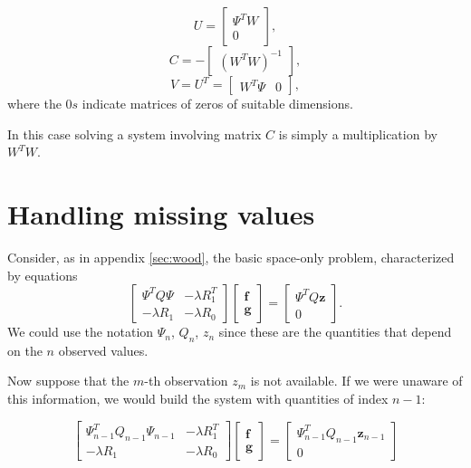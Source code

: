 \begin{equation*}
	U =
	\begin{bmatrix}
		\Psi^TW \\
		0
	\end{bmatrix}
	,
\end{equation*}
\begin{equation*}
	C = -
	\begin{bmatrix}
		\left(W^TW\right)^{-1}
	\end{bmatrix}
	,
\end{equation*}
\begin{equation*}
	V = U^T =
	\begin{bmatrix}
		W^T\Psi & 0
	\end{bmatrix}
	,
\end{equation*} where the $0s$ indicate matrices of zeros of suitable dimensions.

In this case solving a system involving matrix $C$ is simply a multiplication
by $W^T W$.

\section{Handling missing values}
\label{secNA}
Consider, as in appendix \ref{sec:wood}, the basic space-only problem,
characterized by equations
\begin{equation}
	\begin{bmatrix}
		\Psi^TQ\Psi  & -\lambda R_1^T \\
		-\lambda R_1 & -\lambda R_0
	\end{bmatrix}
	\begin{bmatrix}
		\bm{f} \\
		\bm{g}
	\end{bmatrix}
	=
	\begin{bmatrix}{\Psi}^T Q\bm{z} \\
		0
	\end{bmatrix}
	.
\end{equation}
We could use the notation $\Psi_n$, $Q_n$, $z_n$ since these are the
quantities that depend on the $n$ observed values.

Now suppose that the $m$-th observation $z_m$ is not available. If we were
unaware of this information, we would build the system with quantities of index
$n-1$:

\begin{equation}
	\label{n-1}
	\begin{bmatrix}
		\Psi_{n-1}^TQ_{n-1}\Psi_{n-1} & -\lambda R_1^T \\
		-\lambda R_1                  & -\lambda R_0
	\end{bmatrix}
	\begin{bmatrix}
		\bm{f} \\
		\bm{g}
	\end{bmatrix}
	=
	\begin{bmatrix}{\Psi}_{n-1}^T Q_{n-1}\bm{z}_{n-1} \\
		0
	\end{bmatrix}
\end{equation}


